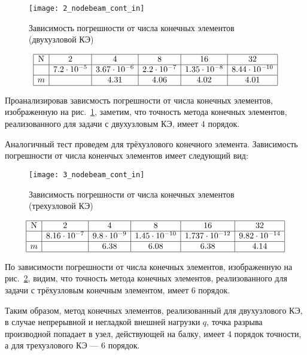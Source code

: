 \documentclass[12pt,a4paper]{article}
\begin{document}
\begin{figure}[H]
		\centering
		\texttt{[image: 2\_nodebeam\_cont\_in]}
		\caption{Зависимость погрешности от числа конечных элементов (двухузловой КЭ)}
		\label{fig:2_nodebeam_cont_in}
\end{figure}


	
\[
\begin{array}{|c|c|c|c|c|c|}
\hline
\text{N} & 2 & 4 & 8 & 16 & 32 \\ \hline
\Delta  & 7.2 \cdot 10^{-5} & 3.67 \cdot 10^{-6} & 2.2 \cdot 10^{-7} & 1.35 \cdot 10^{-8} & 8.44 \cdot 10^{-10}\\ \hline
m  &  & 4.31 & 4.06 & 4.02 & 4.01 \\ 
\hline
\end{array}
\]



Проанализировав зависмость погрешности от числа конечных элементов, изображенную на рис.~\ref{fig:2_nodebeam_cont_in}, заметим, что точность метода конечных элементов, реализованного для задачи с двухузловым КЭ, имеет 4 порядок. 

Аналогичный тест проведем для трёхузлового конечного элемента. Зависимость погрешности от числа коненчых элементов имеет следующий вид: \\
\begin{figure}[H]
		\centering
		\texttt{[image: 3\_nodebeam\_cont\_in]}
		\caption{Зависимость погрешности от числа конечных элементов (трехузловой КЭ)}
		\label{fig:3_nodebeam_cont_in}
\end{figure}


	
\[
\begin{array}{|c|c|c|c|c|c|}
\hline
\text{N} & 2 & 4 & 8 & 16 & 32\\ \hline
\Delta  & 8.16 \cdot 10^{-7} & 9.8 \cdot 10^{-9} & 1.45 \cdot 10^{-10} & 1.737 \cdot 10^{-12} & 9.82 \cdot 10^{-14}\\ \hline
m &  & 6.38 & 6.08 & 6.38 & 4.14 \\ 
\hline
\end{array}
\]

По зависимости погрешности от числа конечных элементов, изображенную на рис.~\ref{fig:3_nodebeam_cont_in}, видим, что точность метода конечных элементов, реализованного для задачи с трёхузловым конечным элементом, имеет 6 порядок. 

Таким образом, метод конечных элементов, реализованный для двухузлового КЭ, в случае непрерывной и негладкой внешней нагрузки $q$, точка разрыва производной попадает в узел, действующей на балку, имеет 4 порядок точности, а для трехузлового КЭ --- 6 порядок. \\
\end{document}
